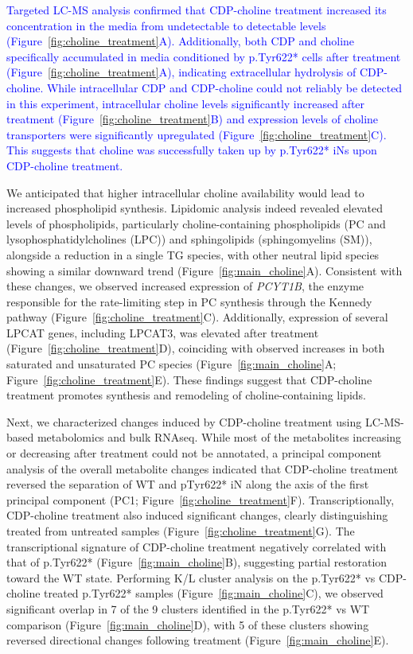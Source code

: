 \documentclass[12pt]{article}
\begin{document}
\newcommand{\quoteD}{\textcolor{blue}{Targeted LC-MS analysis confirmed that CDP-choline treatment increased its concentration in the media from undetectable to detectable levels (Figure~\ref{fig:choline_treatment}A). Additionally, both CDP and choline specifically accumulated in media conditioned by p.Tyr622* cells after treatment (Figure~\ref{fig:choline_treatment}A), indicating extracellular hydrolysis of CDP-choline. While intracellular CDP and CDP-choline could  not reliably be detected in this experiment, intracellular choline levels significantly increased after treatment (Figure~\ref{fig:choline_treatment}B) and expression levels of choline transporters were significantly upregulated (Figure~\ref{fig:choline_treatment}C). This suggests that choline was successfully taken up by p.Tyr622* iNs upon CDP-choline treatment.\label{quoteD-label}}} 
\quoteD

We anticipated that higher intracellular choline availability would lead to increased phospholipid synthesis. Lipidomic analysis indeed revealed elevated levels of phospholipids, particularly choline-containing phospholipids (PC and lysophosphatidylcholines (LPC)) and sphingolipids (sphingomyelins (SM)), alongside a reduction in a single TG species, with other neutral lipid species showing a similar downward trend (Figure~\ref{fig:main_choline}A). Consistent with these changes, we observed increased expression of \textit{PCYT1B}, the enzyme responsible for the rate-limiting step in PC synthesis through the Kennedy pathway (Figure~\ref{fig:choline_treatment}C). Additionally, expression of several LPCAT genes, including LPCAT3, was elevated after treatment (Figure~\ref{fig:choline_treatment}D), coinciding with observed increases in both saturated and unsaturated PC species (Figure~\ref{fig:main_choline}A; Figure~\ref{fig:choline_treatment}E). These findings suggest that CDP-choline treatment promotes synthesis and remodeling of choline-containing lipids.

Next, we characterized changes induced by CDP-choline treatment using LC-MS-based metabolomics and bulk RNAseq. While most of the metabolites increasing or decreasing after treatment could not be annotated, a principal component analysis of the overall metabolite changes indicated that CDP-choline treatment reversed the separation of WT and pTyr622* iN along the axis of the first principal component (PC1; Figure~\ref{fig:choline_treatment}F). Transcriptionally, CDP-choline treatment also induced significant changes, clearly distinguishing treated from untreated samples (Figure~\ref{fig:choline_treatment}G). The transcriptional signature of CDP-choline treatment negatively correlated with that of p.Tyr622* (Figure~\ref{fig:main_choline}B), suggesting partial restoration toward the WT state. Performing K/L cluster analysis on the p.Tyr622* vs CDP-choline treated p.Tyr622* samples (Figure~\ref{fig:main_choline}C), we observed significant overlap in 7 of the 9 clusters identified in the p.Tyr622* vs WT comparison (Figure~\ref{fig:main_choline}D), with 5 of these clusters showing reversed directional changes following treatment (Figure~\ref{fig:main_choline}E). 
\end{document}
